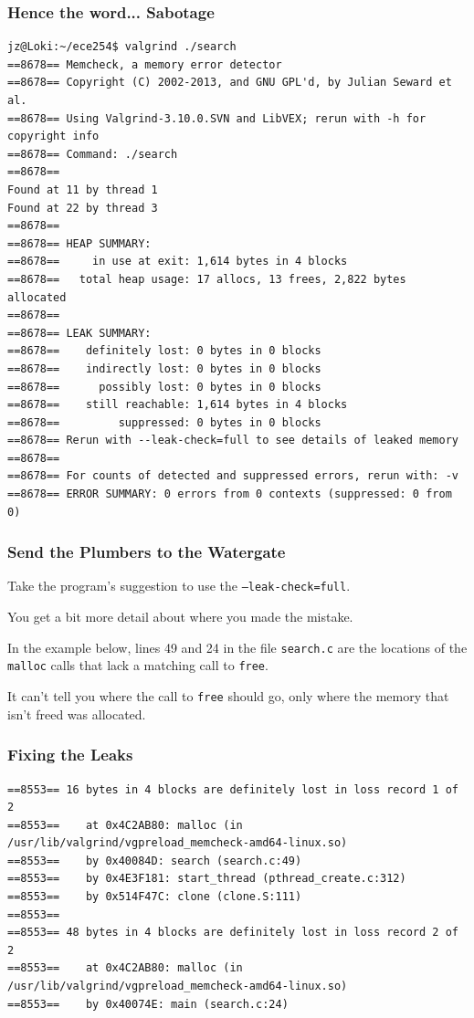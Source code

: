 \begin{frame}[fragile]
	\frametitle{Hence the word... Sabotage}
	{\scriptsize
		\begin{verbatim}
jz@Loki:~/ece254$ valgrind ./search 
==8678== Memcheck, a memory error detector
==8678== Copyright (C) 2002-2013, and GNU GPL'd, by Julian Seward et al.
==8678== Using Valgrind-3.10.0.SVN and LibVEX; rerun with -h for copyright info
==8678== Command: ./search
==8678== 
Found at 11 by thread 1 
Found at 22 by thread 3 
==8678== 
==8678== HEAP SUMMARY:
==8678==     in use at exit: 1,614 bytes in 4 blocks
==8678==   total heap usage: 17 allocs, 13 frees, 2,822 bytes allocated
==8678== 
==8678== LEAK SUMMARY:
==8678==    definitely lost: 0 bytes in 0 blocks
==8678==    indirectly lost: 0 bytes in 0 blocks
==8678==      possibly lost: 0 bytes in 0 blocks
==8678==    still reachable: 1,614 bytes in 4 blocks
==8678==         suppressed: 0 bytes in 0 blocks
==8678== Rerun with --leak-check=full to see details of leaked memory
==8678== 
==8678== For counts of detected and suppressed errors, rerun with: -v
==8678== ERROR SUMMARY: 0 errors from 0 contexts (suppressed: 0 from 0)
\end{verbatim}
	}

\end{frame}


\begin{frame}
	\frametitle{Send the Plumbers to the Watergate}


	Take the program's suggestion to use the \texttt{--leak-check=full}.

	You get a bit more detail about where you made the mistake.

	In the example below, lines 49 and 24 in the file \texttt{search.c} are the locations of the \texttt{malloc} calls that lack a matching call to \texttt{free}.

	It can't tell you where the call to \texttt{free} should go, only where the memory that isn't freed was allocated.

\end{frame}

\begin{frame}[fragile]
	\frametitle{Fixing the Leaks}

	{\scriptsize
		\begin{verbatim}
==8553== 16 bytes in 4 blocks are definitely lost in loss record 1 of 2
==8553==    at 0x4C2AB80: malloc (in /usr/lib/valgrind/vgpreload_memcheck-amd64-linux.so)
==8553==    by 0x40084D: search (search.c:49)
==8553==    by 0x4E3F181: start_thread (pthread_create.c:312)
==8553==    by 0x514F47C: clone (clone.S:111)
==8553== 
==8553== 48 bytes in 4 blocks are definitely lost in loss record 2 of 2
==8553==    at 0x4C2AB80: malloc (in /usr/lib/valgrind/vgpreload_memcheck-amd64-linux.so)
==8553==    by 0x40074E: main (search.c:24)
\end{verbatim}
	}

\end{frame}


